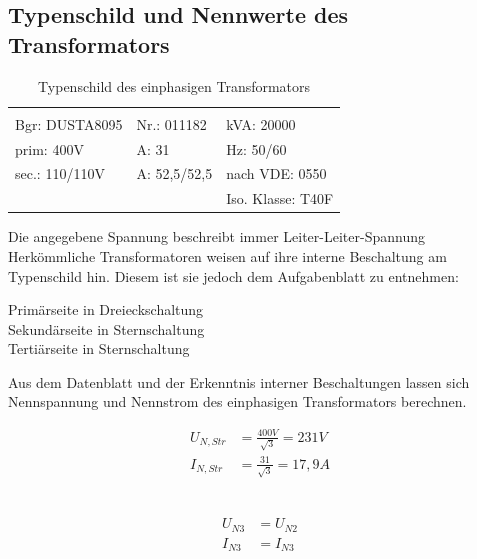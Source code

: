 \documentclass{article}
\begin{document}
		\subsection{Typenschild und Nennwerte des Transformators}
		
			\begin{table}[H]
				\begin{tabular}{l l l}
					\hline \\
					Bgr: DUSTA8095 & Nr.: 011182 & kVA: 20000 \\
					prim: 400V & A: 31 & Hz: 50/60 \\
					sec.: 110/110V & A: 52,5/52,5 & nach VDE: 0550 \\
												& & Iso. Klasse: T40F \\
					\hline
				\end{tabular}
				\caption{Typenschild des einphasigen Transformators}
			\end{table}
			Die angegebene Spannung beschreibt immer Leiter-Leiter-Spannung
			Herkömmliche Transformatoren weisen auf ihre interne Beschaltung am Typenschild hin. Diesem ist sie jedoch dem Aufgabenblatt zu entnehmen:
			\begin{center}
				Primärseite in Dreieckschaltung\\
				Sekundärseite in Sternschaltung\\
				Tertiärseite in Sternschaltung		
			\end{center}
			
			Aus dem Datenblatt und der Erkenntnis interner Beschaltungen lassen sich Nennspannung und Nennstrom des einphasigen Transformators berechnen.
			\begin{formel}
				\begin{align*}
					U_{N, Str} &= \frac{400V}{\sqrt{3}} = 231V \\
					I_{N, Str} &= \frac{31}{\sqrt{3}} = 17,9A
				\end{align*}	
				\caption{$U_{N1}$ und $I_{N1}$}
			\end{formel}
			
			\begin{formel}
				\begin{align*}

				\end{align*}	
				\caption{$U_{N2}$ und $I_{N2}$}
			\end{formel}
			
			\begin{formel}
				\begin{align*}
					U_{N3} &= U_{N2} \\
					I_{N3} &= I_{N3}
				\end{align*}	
				\caption{$U_{N3}$ und $I_{N3}$}
			\end{formel}
			
\end{document}
